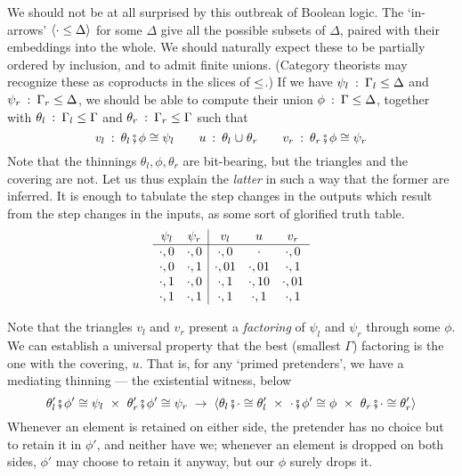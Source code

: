 \documentclass[orivec]{jfp}
\newcommand{\D}[1]{\blue{\mathbf{#1}}}
\newcommand{\C}[1]{\red{\mathrm{#1}}}
\newcommand{\hab}{\::\:}
\renewcommand{\to}{\mathrel{\blue{\rightarrow}}}
\newcommand{\XX}{\mathrel{\D{\times}}}
\newcommand{\snoc}[2]{#1\C{,}\,#2}
\newcommand{\thi}{\mathrel{\D{\le}}}
\newcommand{\cov}{\mathrel{\D{\cup}}}
\newcommand{\bO}{\C{0}}
\newcommand{\bI}{\C{1}}
\newcommand{\Tri}[3]{#1 \mathop{\D{\fatsemi}} #2 \mathrel{\D{\cong}} #3}
\newcommand{\Ex}[1]{\D{\langle}#1\D{\rangle}}
\begin{document}
We should not be at all surprised by this outbreak of Boolean logic. The `in-arrows' $\Ex{\cdot\thi\Delta}$ for some $\Delta$ give all the possible subsets of $\Delta$, paired with their embeddings into the whole. We should naturally expect these to be partially ordered by inclusion, and to admit finite unions. (Category theorists may recognize these as coproducts in the slices of $\thi$.) If we have $\psi_l\hab\Gamma_l\thi\Delta$ and $\psi_r\hab\Gamma_r\thi\Delta$, we should be able to compute their union $\phi\hab\Gamma\thi\Delta$, together with $\theta_l\hab\Gamma_l\thi\Gamma$ and $\theta_r\hab\Gamma_r\thi\Gamma$ such that
\[
v_l\hab\Tri{\theta_l}\phi{\psi_l} \qquad u\hab \theta_l\cov\theta_r\qquad v_r\hab\Tri{\theta_r}\phi{\psi_r}
\]
Note that the thinnings $\theta_l,\phi,\theta_r$ are bit-bearing, but the triangles and the covering are not. Let us thus explain the \emph{latter} in such a way that the former are inferred. It is enough to tabulate the step changes in the outputs which result from the step changes in the inputs, as some sort of glorified truth table.
\[\begin{array}{cc|ccc}
\psi_l & \psi_r & v_l & u & v_r \\
\hline
\snoc\cdot\bO & \snoc\cdot\bO & \snoc\cdot\bO & \cdot & \snoc\cdot\bO \\
\snoc\cdot\bO & \snoc\cdot\bI & \snoc\cdot\bO\bI & \snoc\cdot\bO\bI & \snoc\cdot\bI \\
\snoc\cdot\bI & \snoc\cdot\bO & \snoc\cdot\bI & \snoc\cdot\bI\bO & \snoc\cdot\bO\bI \\
\snoc\cdot\bI & \snoc\cdot\bI & \snoc\cdot\bI & \snoc\cdot\bI & \snoc\cdot\bI \\
\end{array}\]

Note that the triangles $v_l$ and $v_r$ present a \emph{factoring} of $\psi_l$ and $\psi_r$ through some $\phi$. We can establish a universal property that the best (smallest $\Gamma$) factoring is the one with the covering, $u$. That is, for any `primed pretenders', we have a mediating thinning --- the existential witness, below
\[
\Tri{\theta'_l}{\phi'}{\psi_l} \;\XX\; \Tri{\theta'_r}{\phi'}{\psi_r}
\;\to\;
\Ex{\Tri{\theta_l}\cdot{\theta'_l}\;\XX\;
  \Tri\cdot{\phi'}{\phi}\;\XX\;
  \Tri{\theta_r}\cdot{\theta'_r}}
\]
Whenever an element is retained on either side, the pretender has no choice but to retain it in $\phi'$, and neither have we; whenever an element is dropped on both sides, $\phi'$ may choose to retain it anyway, but our $\phi$ surely drops it.
\end{document}
